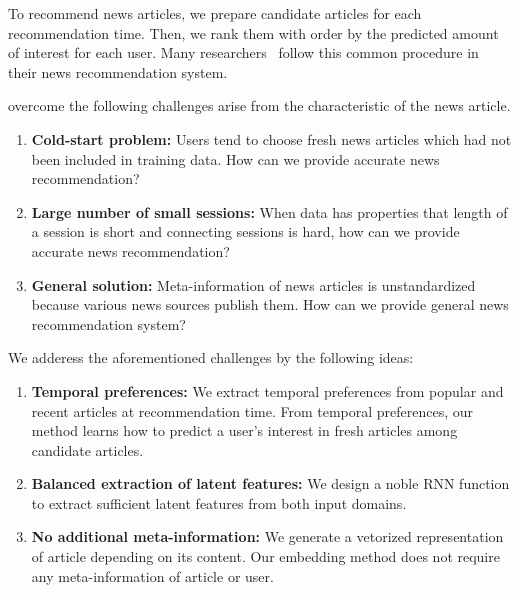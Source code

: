 To recommend news articles, we prepare candidate articles for each recommendation time. 
Then, we rank them with order by the predicted amount of interest for each user.
Many researchers~\cite{Yahoo2017, Naver2017, Chameleon} follow this common procedure in their news recommendation system.

\method overcome the following challenges arise from the characteristic of the news article.

\begin{enumerate}
	\item \textbf{Cold-start problem:}
Users tend to choose fresh news articles which had not been included in training data.
How can we provide accurate news recommendation?
	\item \textbf{Large number of small sessions:}
When data has properties that length of a session is short and connecting sessions is hard, how can we provide accurate news recommendation?
	\item \textbf{General solution:}
Meta-information of news articles is unstandardized because various news sources publish them.
How can we provide general news recommendation system?
\end{enumerate}

We adderess the aforementioned challenges by the following ideas:

\begin{enumerate}
	\item \textbf{Temporal preferences:}
We extract temporal preferences from popular and recent articles at recommendation time.
From temporal preferences, our method learns how to predict a user’s interest in fresh articles among candidate articles.
	\item \textbf{Balanced extraction of latent features:}
We design a noble RNN function to extract sufficient latent features from both input domains.
	\item \textbf{No additional meta-information:}
We generate a vetorized representation of article depending on its content.
Our embedding method does not require any meta-information of article or user.
\end{enumerate}



